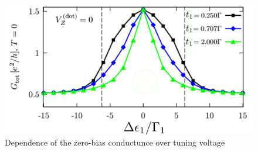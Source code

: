  \begin{figure}
 \centering
 \includegraphics[scale=0.5]{IMAGES/Majorana/Luis.png}
 \caption{\label{fig:Luis}Dependence of the zero-bias conductunce over tuning voltage \protect{}}
 \end{figure}

















